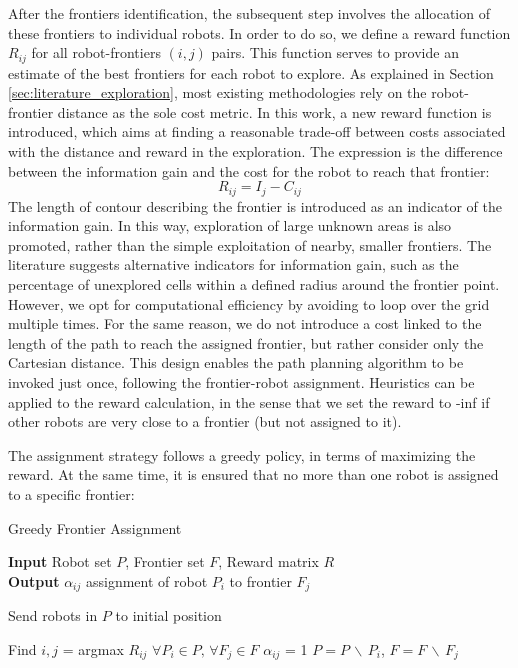 After the frontiers identification, the subsequent step involves the allocation of these frontiers to individual robots. In order to do so, we define a reward function $R_{ij}$ for all robot-frontiers $(i,j)$ pairs. This function serves to provide an estimate of the best frontiers for each robot to explore.
As explained in Section \ref{sec:literature_exploration}, most existing methodologies rely on the robot-frontier distance as the sole cost metric. In this work, a new reward function is introduced, which aims at finding a reasonable trade-off between costs associated with the distance and reward in the exploration. The expression is the difference between the information gain and the cost for the robot to reach that frontier:
$$ R_{ij} = I_{j} - C_{ij}$$
The length of contour describing the frontier is introduced as an indicator of the information gain. In this way, exploration of large unknown areas is also promoted, rather than the simple exploitation of nearby, smaller frontiers.
The literature suggests alternative indicators for information gain, such as the percentage of unexplored cells within a defined radius around the frontier point. However, we opt for computational efficiency by avoiding to loop over the grid multiple times. For the same reason, we do not introduce a cost linked to the length of the path to reach the assigned frontier, but rather consider only the Cartesian distance. This design enables the path planning algorithm to be invoked just once, following the frontier-robot assignment.
Heuristics can be applied to the reward calculation, in the sense that we set the reward to -inf if other robots are very close to a frontier (but not assigned to it). 

The assignment strategy follows a greedy policy, in terms of maximizing the reward. At the same time, it is ensured that no more than one robot is assigned to a specific frontier:
\begin{algorithm}
\caption{Greedy Frontier Assignment}
 \hspace*{\algorithmicindent} \textbf{Input} Robot set $P$, Frontier set $F$, Reward matrix $R$\\
 \hspace*{\algorithmicindent} \textbf{Output} $\alpha_{ij}$  assignment of robot $P_i$ to frontier $F_j$\\
\begin{algorithmic}[]

        \STATE Send robots in $P$ to initial position
    \ELSE
    
    \STATE Find $i,j$ = argmax $R_{ij}$ $\forall P_i \in P, \,\forall F_j \in F$
    \STATE $\alpha_{ij}$ = 1
    \ENDIF
    \STATE $P = P \,\backslash\, P_i$, $F = F \,\backslash\, F_j$
    \ENDWHILE{}
\end{algorithmic}
\end{algorithm}


